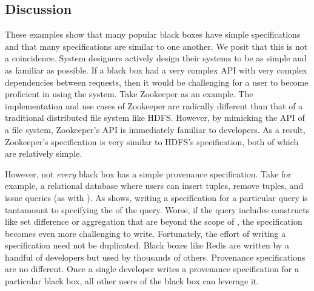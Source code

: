 \subsection{Discussion}
These examples show that many popular black boxes have simple \watprovenance{}
specifications and that many \watprovenance{} specifications are similar to one
another. We posit that this is not a coincidence. System designers actively
design their systems to be as simple and as familiar as possible. If a black
box had a very complex API with very complex dependencies between requests,
then it would be challenging for a user to become proficient in using the
system. 
Take Zookeeper as an example. The implementation and use cases of
Zookeeper are radically different than that of a traditional distributed file
system like HDFS. However, by mimicking the API of a file system, Zookeeper's
API is immediately familiar to developers. As a result, Zookeeper's
\watprovenance{} specification is very similar to HDFS's \watprovenance{}
specification, both of which are relatively simple.

However, not \emph{every} black box has a simple provenance specification. Take
for example, a relational database where users can insert tuples, remove
tuples, and issue queries (as with ). As
 shows, writing a \watprovenance{} specification for a
particular query is tantamount to specifying the \whyprovenance{} of the query.
Worse, if the query includes constructs like set difference or aggregation that
are beyond the scope of \whyprovenance{}, the \watprovenance{} specification
becomes even more challenging to write. 
Fortunately, the effort of writing a
\watprovenance{} specification need not be duplicated. Black boxes like Redis
are written by a handful of developers but used by thousands of others.
Provenance specifications are no different. Once a single developer writes a
provenance specification for a particular black box, all other users of the
black box can leverage it.


